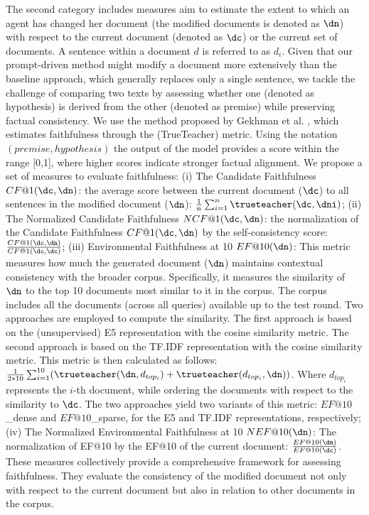  The second category includes measures aim to estimate the extent to which an agent has changed her document (the modified documents is denoted as $\dn$) with respect to the current document (denoted as $\dc$) or the current set of documents. A sentence within a document $d$ is referred to as $d_i$. Given that our prompt-driven method might modify a document more extensively than the baseline approach, which generally replaces only a single sentence, we tackle the challenge of comparing two texts by assessing whether one (denoted as hypothesis) is derived from the other (denoted as premise) while preserving factual consistency. We use the method proposed by Gekhman et al. \cite{gekhman2023trueteacher}, which estimates faithfulness through the \trueteacher{} (TrueTeacher) metric. Using the notation \trueteacher $(premise, hypothesis)$ the output of the model provides a score within the range [0,1], where higher scores indicate stronger factual alignment. We propose a set of measures to evaluate faithfulness: (i) The Candidate Faithfulness $CF@1(\dc, \dn)$: the average \trueteacher{} score between the current document ($\dc$) to all sentences in the modified document ($\dn$): $\frac{1}{n} \sum_{i=1}^n \trueteacher (\dc, \dni)$; (ii) The Normalized Candidate Faithfulness $NCF@1(\dc, \dn)$: the normalization of the Candidate Faithfulness $CF@1(\dc, \dn)$ by the self-consistency score: $\frac{CF@1 (\dc, \dn)}{CF@1(\dc, \dc)}$; (iii) Environmental Faithfulness at 10 $EF@10(\dn)$: This metric measures how much the generated document ($\dn$) maintains contextual consistency with the broader corpus. Specifically, it measures the similarity of $\dn$ to the top 10 documents most similar to it in the corpus.
The corpus includes all the documents (across all queries) available up to the test round. Two approaches are employed to compute the similarity. The first approach is based on the (unsupervised) E5 \cite{wang2022text} representation with the cosine similarity metric. The second approach is based on the TF.IDF \cite{sparck1972statistical, salton1975vector} representation with the cosine similarity metric. This metric is then calculated as follows: $\frac{1}{2*10} \sum_{i=1}^{10} (\trueteacher(\dn, d_{top_{i}}) + \trueteacher(d_{top_i}, \dn))$. Where $d_{top_{i}}$ represents the $i$-th document, while ordering the documents with respect to the similarity to $\dc$. The two approaches yield two variants of this metric: $EF@10$\_dense and $EF@10$\_sparse, for the E5 and TF.IDF representations, respectively; (iv) The Normalized Environmental Faithfulness at 10 $NEF@10(\dn)$: The normalization of EF@10 by the EF@10 of the current document: $\frac{EF@10(\dn)}{EF@10(\dc)}$. These measures collectively provide a comprehensive framework for assessing faithfulness. They evaluate the consistency of the modified document not only with respect to the current document but also in relation to other documents in the corpus.

